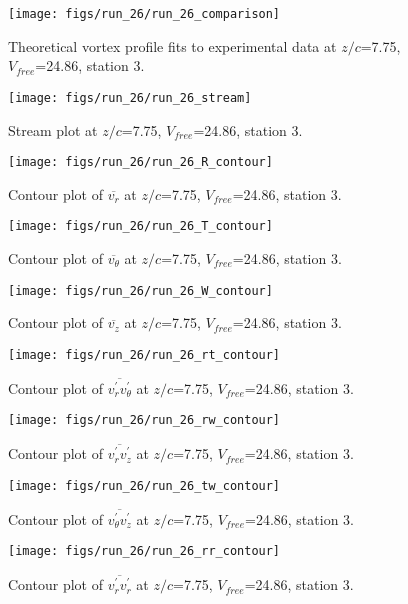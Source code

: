 \begin{figure}[H]
\centering
\texttt{[image: figs/run\_26/run\_26\_comparison]}
\caption{Theoretical vortex profile fits to experimental data at $z/c$=7.75, $V_{free}$=24.86, station 3.}
\end{figure}


\begin{figure}[H]
\centering
\texttt{[image: figs/run\_26/run\_26\_stream]}
\caption{Stream plot at $z/c$=7.75, $V_{free}$=24.86, station 3.}
\end{figure}


\begin{figure}[H]
\centering
\texttt{[image: figs/run\_26/run\_26\_R\_contour]}
\caption{Contour plot of $\overline{v_{r}}$ at $z/c$=7.75, $V_{free}$=24.86, station 3.}
\end{figure}


\begin{figure}[H]
\centering
\texttt{[image: figs/run\_26/run\_26\_T\_contour]}
\caption{Contour plot of $\overline{v_{\theta}}$ at $z/c$=7.75, $V_{free}$=24.86, station 3.}
\end{figure}


\begin{figure}[H]
\centering
\texttt{[image: figs/run\_26/run\_26\_W\_contour]}
\caption{Contour plot of $\overline{v_{z}}$ at $z/c$=7.75, $V_{free}$=24.86, station 3.}
\end{figure}


\begin{figure}[H]
\centering
\texttt{[image: figs/run\_26/run\_26\_rt\_contour]}
\caption{Contour plot of $\overline{v_{r}^{\prime} v_{\theta}^{\prime}}$ at $z/c$=7.75, $V_{free}$=24.86, station 3.}
\end{figure}


\begin{figure}[H]
\centering
\texttt{[image: figs/run\_26/run\_26\_rw\_contour]}
\caption{Contour plot of $\overline{v_{r}^{\prime} v_{z}^{\prime}}$ at $z/c$=7.75, $V_{free}$=24.86, station 3.}
\end{figure}


\begin{figure}[H]
\centering
\texttt{[image: figs/run\_26/run\_26\_tw\_contour]}
\caption{Contour plot of $\overline{v_{\theta}^{\prime} v_{z}^{\prime}}$ at $z/c$=7.75, $V_{free}$=24.86, station 3.}
\end{figure}


\begin{figure}[H]
\centering
\texttt{[image: figs/run\_26/run\_26\_rr\_contour]}
\caption{Contour plot of $\overline{v_{r}^{\prime} v_{r}^{\prime}}$ at $z/c$=7.75, $V_{free}$=24.86, station 3.}
\end{figure}


